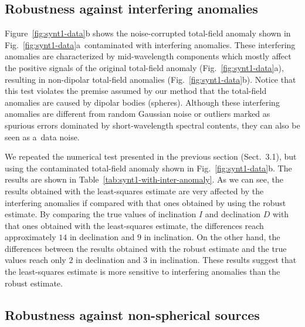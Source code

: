 \documentclass[journal abbreviation, npg]{copernicus}
\begin{document}
\subsection{Robustness against interfering anomalies}

Figure~\ref{fig:synt1-data}b shows the noise-corrupted total-field
anomaly shown in Fig.~\ref{fig:synt1-data}a~contaminated with
interfering anomalies. These interfering anomalies are characterized
by mid-wavelength components which mostly affect the positive signals
of the original total-field anomaly (Fig.~\ref{fig:synt1-data}a),
resulting in non-dipolar total-field anomalies
(Fig.~\ref{fig:synt1-data}b). Notice that this test violates the
premise assumed by our method that the total-field anomalies are
caused by dipolar bodies (spheres). Although these interfering
anomalies are different from random Gaussian noise or outliers marked
as spurious errors dominated by short-wavelength spectral contents,
they can also be seen as a~data noise.

We repeated the numerical test presented in the previous section (Sect.~3.1),
but using the contaminated total-field anomaly shown in
Fig.~\ref{fig:synt1-data}b. The results are shown in
Table~\ref{tab:synt1-with-inter-anomaly}. As we can see, the results obtained
with the least-squares estimate are very affected by the interfering
anomalies if compared with that ones obtained by using the robust estimate.
By comparing the true values of inclination $I$ and declination $D$ with that
ones obtained with the least-squares estimate, the differences reach
approximately $14${\degree} in declination and $9${\degree} in inclination.
On the other hand, the differences between the results obtained with the
robust estimate and the true values reach only $2${\degree} in declination
and $3${\degree} in inclination. These results suggest that the least-squares
estimate is more sensitive to interfering anomalies than the robust estimate.

\subsection{Robustness against non-spherical sources}
\end{document}
